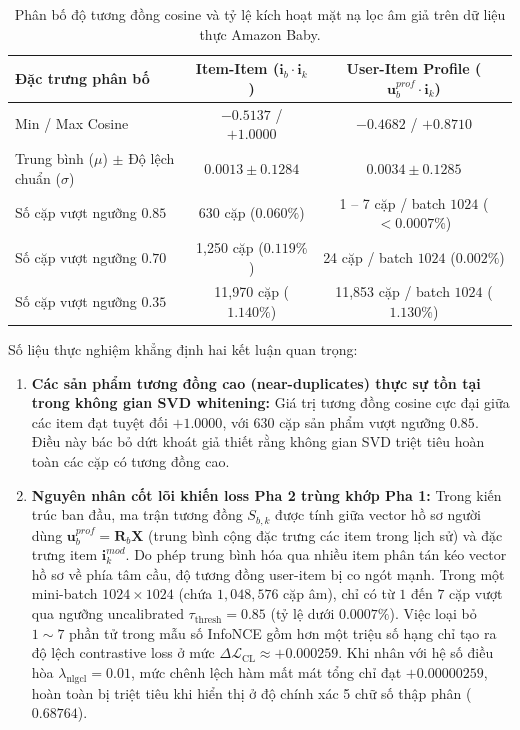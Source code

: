 \begin{table}[htbp]
\centering
\small
\caption{Phân bố độ tương đồng cosine và tỷ lệ kích hoạt mặt nạ lọc âm giả trên dữ liệu thực Amazon Baby.}
\label{tab:stair_v5_fn_diag}
\begin{tabular}{lcc}
\toprule
\textbf{Đặc trưng phân bố} & \textbf{Item-Item ($\mathbf{i}_b \cdot \mathbf{i}_k$)} & \textbf{User-Item Profile ($\mathbf{u}_b^{prof} \cdot \mathbf{i}_k$)} \\
\midrule
Min / Max Cosine & $-0.5137$ / $+1.0000$ & $-0.4682$ / $+0.8710$ \\
Trung bình ($\mu$) $\pm$ Độ lệch chuẩn ($\sigma$) & $0.0013 \pm 0.1284$ & $0.0034 \pm 0.1285$ \\
Số cặp vượt ngưỡng $0.85$ & 630 cặp ($0.060\%$) & 1 -- 7 cặp / batch $1024$ ($< 0.0007\%$) \\
Số cặp vượt ngưỡng $0.70$ & 1,250 cặp ($0.119\%$) & 24 cặp / batch $1024$ ($0.002\%$) \\
Số cặp vượt ngưỡng $0.35$ & 11,970 cặp ($1.140\%$) & 11,853 cặp / batch $1024$ ($1.130\%$) \\
\bottomrule
\end{tabular}
\end{table}

Số liệu thực nghiệm khẳng định hai kết luận quan trọng:
\begin{enumerate}
    \item \textbf{Các sản phẩm tương đồng cao (near-duplicates) thực sự tồn tại trong không gian SVD whitening:} Giá trị tương đồng cosine cực đại giữa các item đạt tuyệt đối $+1.0000$, với 630 cặp sản phẩm vượt ngưỡng $0.85$. Điều này bác bỏ dứt khoát giả thiết rằng không gian SVD triệt tiêu hoàn toàn các cặp có tương đồng cao.
    \item \textbf{Nguyên nhân cốt lõi khiến loss Pha 2 trùng khớp Pha 1:} Trong kiến trúc ban đầu, ma trận tương đồng $S_{b, k}$ được tính giữa vector hồ sơ người dùng $\mathbf{u}_b^{prof} = \mathbf{R}_b\mathbf{X}$ (trung bình cộng đặc trưng các item trong lịch sử) và đặc trưng item $\mathbf{i}_k^{mod}$. Do phép trung bình hóa qua nhiều item phân tán kéo vector hồ sơ về phía tâm cầu, độ tương đồng user-item bị co ngót mạnh. Trong một mini-batch $1024 \times 1024$ (chứa $1{,}048{,}576$ cặp âm), chỉ có từ $1$ đến $7$ cặp vượt qua ngưỡng uncalibrated $\tau_{\text{thresh}} = 0.85$ (tỷ lệ dưới $0.0007\%$). Việc loại bỏ $1 \sim 7$ phần tử trong mẫu số InfoNCE gồm hơn một triệu số hạng chỉ tạo ra độ lệch contrastive loss ở mức $\Delta \mathcal{L}_{\text{CL}} \approx +0.000259$. Khi nhân với hệ số điều hòa $\lambda_{\text{nlgcl}} = 0.01$, mức chênh lệch hàm mất mát tổng chỉ đạt $+0.00000259$, hoàn toàn bị triệt tiêu khi hiển thị ở độ chính xác 5 chữ số thập phân ($0.68764$).
\end{enumerate}

